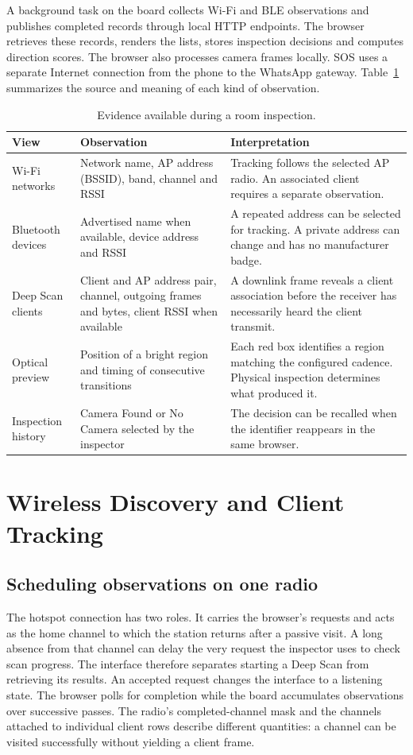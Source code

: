 \documentclass[conference]{IEEEtran}
\begin{document}
A background task on the board collects Wi-Fi and BLE observations and publishes completed records through local HTTP endpoints. The browser retrieves these records, renders the lists, stores inspection decisions and computes direction scores. The browser also processes camera frames locally. SOS uses a separate Internet connection from the phone to the WhatsApp gateway. Table~\ref{tab:observations} summarizes the source and meaning of each kind of observation.

\begin{table}[t]
\centering
\caption{Evidence available during a room inspection.}
\label{tab:observations}
\renewcommand{\arraystretch}{1.18}
\begin{tabular}{@{}p{}p{}p{}@{}}
\toprule
View & Observation & Interpretation \\
\midrule
Wi-Fi networks & Network name, AP address (BSSID), band, channel and RSSI & Tracking follows the selected AP radio. An associated client requires a separate observation. \\
Bluetooth devices & Advertised name when available, device address and RSSI & A repeated address can be selected for tracking. A private address can change and has no manufacturer badge. \\
Deep Scan clients & Client and AP address pair, channel, outgoing frames and bytes, client RSSI when available & A downlink frame reveals a client association before the receiver has necessarily heard the client transmit. \\
Optical preview & Position of a bright region and timing of consecutive transitions & Each red box identifies a region matching the configured cadence. Physical inspection determines what produced it. \\
Inspection history & Camera Found or No Camera selected by the inspector & The decision can be recalled when the identifier reappears in the same browser. \\
\bottomrule
\end{tabular}
\end{table}

\section{Wireless Discovery and Client Tracking}
\subsection{Scheduling observations on one radio}
The hotspot connection has two roles. It carries the browser's requests and acts as the home channel to which the station returns after a passive visit. A long absence from that channel can delay the very request the inspector uses to check scan progress. The interface therefore separates starting a Deep Scan from retrieving its results. An accepted request changes the interface to a listening state. The browser polls for completion while the board accumulates observations over successive passes. The radio's completed-channel mask and the channels attached to individual client rows describe different quantities: a channel can be visited successfully without yielding a client frame.
\end{document}

